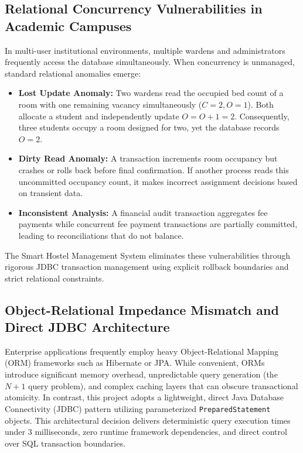 \documentclass[12pt,a4paper]{report}
\begin{document}
\subsection{Relational Concurrency Vulnerabilities in Academic Campuses}
In multi-user institutional environments, multiple wardens and administrators frequently access the database simultaneously. When concurrency is unmanaged, standard relational anomalies emerge:
\begin{itemize}
\item \textbf{Lost Update Anomaly:} Two wardens read the occupied bed count of a room with one remaining vacancy simultaneously ($C=2, O=1$). Both allocate a student and independently update $O = O + 1 = 2$. Consequently, three students occupy a room designed for two, yet the database records $O=2$.
\item \textbf{Dirty Read Anomaly:} A transaction increments room occupancy but crashes or rolls back before final confirmation. If another process reads this uncommitted occupancy count, it makes incorrect assignment decisions based on transient data.
\item \textbf{Inconsistent Analysis:} A financial audit transaction aggregates fee payments while concurrent fee payment transactions are partially committed, leading to reconciliations that do not balance.
\end{itemize}
The Smart Hostel Management System eliminates these vulnerabilities through rigorous JDBC transaction management using explicit rollback boundaries and strict relational constraints.

\subsection{Object-Relational Impedance Mismatch and Direct JDBC Architecture}
Enterprise applications frequently employ heavy Object-Relational Mapping (ORM) frameworks such as Hibernate or JPA. While convenient, ORMs introduce significant memory overhead, unpredictable query generation (the $N+1$ query problem), and complex caching layers that can obscure transactional atomicity. In contrast, this project adopts a lightweight, direct Java Database Connectivity (JDBC) pattern utilizing parameterized \texttt{PreparedStatement} objects. This architectural decision delivers deterministic query execution times under 3 milliseconds, zero runtime framework dependencies, and direct control over SQL transaction boundaries.
\end{document}
